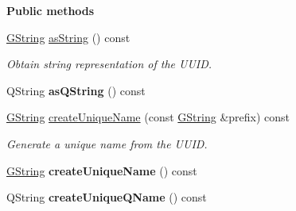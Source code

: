 \begin{Indent}\textbf{ Public methods}\par
\begin{DoxyCompactItemize}
\item 
\mbox{\label{classrev_1_1_uuid_aad366b52798785cf521c02c053ef030a}} 
\mbox{\hyperlink{classrev_1_1_g_string}{G\+String}} \mbox{\hyperlink{classrev_1_1_uuid_aad366b52798785cf521c02c053ef030a}{as\+String}} () const
\begin{DoxyCompactList}\small\item\em Obtain string representation of the U\+U\+ID. \end{DoxyCompactList}\item 
\mbox{\label{classrev_1_1_uuid_a179d98aa6c4777ba26aa603fc9b2bd2b}} 
Q\+String {\bfseries as\+Q\+String} () const
\item 
\mbox{\label{classrev_1_1_uuid_a062b7559d4ed86d91a88d28b1e2e5b06}} 
\mbox{\hyperlink{classrev_1_1_g_string}{G\+String}} \mbox{\hyperlink{classrev_1_1_uuid_a062b7559d4ed86d91a88d28b1e2e5b06}{create\+Unique\+Name}} (const \mbox{\hyperlink{classrev_1_1_g_string}{G\+String}} \&prefix) const
\begin{DoxyCompactList}\small\item\em Generate a unique name from the U\+U\+ID. \end{DoxyCompactList}\item 
\mbox{\label{classrev_1_1_uuid_ac6aae840f3ef4ea0822a1ecd1a62bacc}} 
\mbox{\hyperlink{classrev_1_1_g_string}{G\+String}} {\bfseries create\+Unique\+Name} () const
\item 
\mbox{\label{classrev_1_1_uuid_a4952a9d2aa2dc0d39c084589e968a420}} 
Q\+String {\bfseries create\+Unique\+Q\+Name} () const
\end{DoxyCompactItemize}
\end{Indent}
